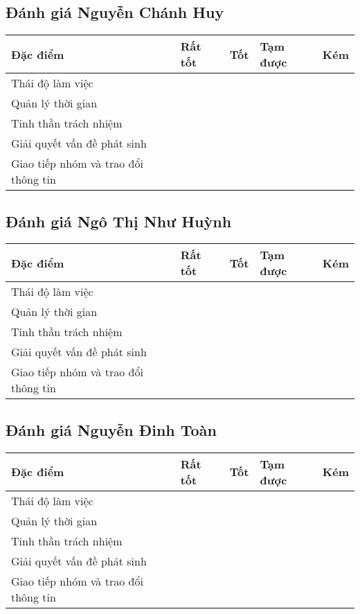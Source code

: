 \documentclass{article}
\begin{document}
\subsection{Đánh giá Nguyễn Chánh Huy}
\begin{tabularx}{\textwidth}{|X|X|X|X|X|}
\hline
\textbf{Đặc điểm} & \textbf{Rất tốt} & \textbf{Tốt} & \textbf{Tạm được} & \textbf{Kém} \\
\hline
Thái độ làm việc & &  & & \\
\hline
Quản lý thời gian &  & & & \\
\hline
Tinh thần trách nhiệm & &  & & \\
\hline
Giải quyết vấn đề phát sinh &  & & & \\
\hline
Giao tiếp nhóm và trao đổi thông tin & &  & & \\
\hline
\end{tabularx}

\subsection{Đánh giá Ngô Thị Như Huỳnh}
\begin{tabularx}{\textwidth}{|X|X|X|X|X|}
\hline
\textbf{Đặc điểm} & \textbf{Rất tốt} & \textbf{Tốt} & \textbf{Tạm được} & \textbf{Kém} \\
\hline
Thái độ làm việc &  & & & \\
\hline
Quản lý thời gian & &  & & \\
\hline
Tinh thần trách nhiệm & &  & & \\
\hline
Giải quyết vấn đề phát sinh &  & & & \\
\hline
Giao tiếp nhóm và trao đổi thông tin & &  & & \\
\hline
\end{tabularx}

\subsection{Đánh giá Nguyễn Đinh Toàn}
\begin{tabularx}{\textwidth}{|X|X|X|X|X|}
\hline
\textbf{Đặc điểm} & \textbf{Rất tốt} & \textbf{Tốt} & \textbf{Tạm được} & \textbf{Kém} \\
\hline
Thái độ làm việc &  & & & \\
\hline
Quản lý thời gian & &  & & \\
\hline
Tinh thần trách nhiệm &  & & & \\
\hline
Giải quyết vấn đề phát sinh & &  & & \\
\hline
Giao tiếp nhóm và trao đổi thông tin &  & & & \\
\hline
\end{tabularx}
\end{document}
